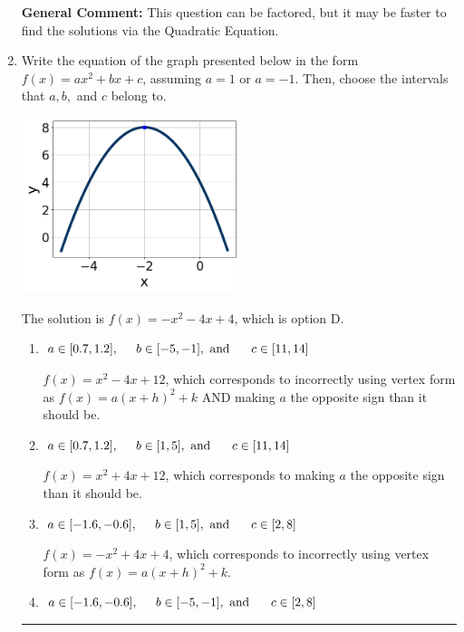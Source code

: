 \documentclass{extbook}[14pt]
\newcommand{\litem}[1]{\item #1

\rule{\textwidth}{0.4pt}}
\begin{document}
\begin{enumerate}
{\textbf{General Comment:} This question can be factored, but it may be faster to find the solutions via the Quadratic Equation.
}
\litem{
Write the equation of the graph presented below in the form $f(x)=ax^2+bx+c$, assuming  $a=1$ or $a=-1$. Then, choose the intervals that $a, b,$ and $c$ belong to.

\begin{center}
    \includegraphics[width=0.5\textwidth]{../Figures/quadraticGraphToEquationCopyB.png}
\end{center}


The solution is \( f(x) = -x^{2} -4 x + 4 \), which is option D.\begin{enumerate}[label=\Alph*.]
\item \( a \in [0.7, 1.2], \hspace*{5mm} b \in [-5, -1], \text{ and } \hspace*{5mm} c \in [11, 14] \)

$f(x)=x^{2} -4 x + 12$, which corresponds to incorrectly using vertex form as $f(x) = a(x+h)^2+k$ AND making $a$ the opposite sign than it should be.
\item \( a \in [0.7, 1.2], \hspace*{5mm} b \in [1, 5], \text{ and } \hspace*{5mm} c \in [11, 14] \)

$f(x)=x^{2} +4 x + 12$, which corresponds to making $a$ the opposite sign than it should be.
\item \( a \in [-1.6, -0.6], \hspace*{5mm} b \in [1, 5], \text{ and } \hspace*{5mm} c \in [2, 8] \)

$f(x)=-x^{2} +4 x + 4$, which corresponds to incorrectly using vertex form as $f(x) = a(x+h)^2+k$.
\item \( a \in [-1.6, -0.6], \hspace*{5mm} b \in [-5, -1], \text{ and } \hspace*{5mm} c \in [2, 8] \)


\end{enumerate}}
\end{enumerate}
\end{document}

